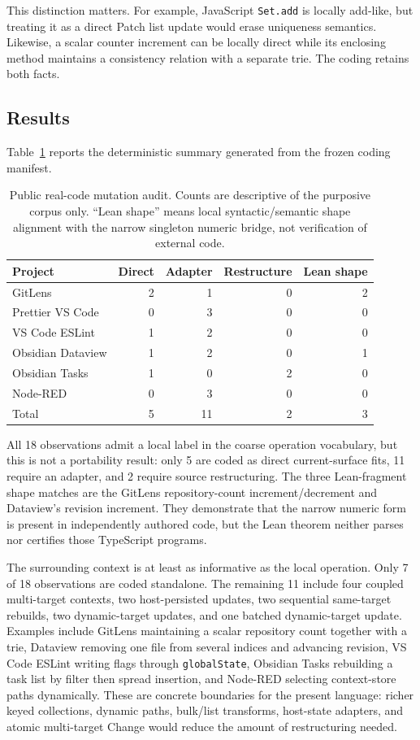 This distinction matters. For example, JavaScript \texttt{Set.add} is locally add-like, but treating it as a direct Patch list update would erase uniqueness semantics. Likewise, a scalar counter increment can be locally direct while its enclosing method maintains a consistency relation with a separate trie. The coding retains both facts.

\subsection{Results}
Table~\ref{tab:real-code-audit} reports the deterministic summary generated from the frozen coding manifest.

\begin{table}[t]
\centering
\caption{Public real-code mutation audit. Counts are descriptive of the purposive corpus only. ``Lean shape'' means local syntactic/semantic shape alignment with the narrow singleton numeric bridge, not verification of external code.}
\label{tab:real-code-audit}
\small
\begin{tabular}{lrrrr}
\toprule
Project & Direct & Adapter & Restructure & Lean shape \\
\midrule
GitLens & 2 & 1 & 0 & 2 \\
Prettier VS Code & 0 & 3 & 0 & 0 \\
VS Code ESLint & 1 & 2 & 0 & 0 \\
Obsidian Dataview & 1 & 2 & 0 & 1 \\
Obsidian Tasks & 1 & 0 & 2 & 0 \\
Node-RED & 0 & 3 & 0 & 0 \\
\midrule
Total & 5 & 11 & 2 & 3 \\
\bottomrule
\end{tabular}
\end{table}

All 18 observations admit a local label in the coarse operation vocabulary, but this is not a portability result: only 5 are coded as direct current-surface fits, 11 require an adapter, and 2 require source restructuring. The three Lean-fragment shape matches are the GitLens repository-count increment/decrement and Dataview's revision increment. They demonstrate that the narrow numeric form is present in independently authored code, but the Lean theorem neither parses nor certifies those TypeScript programs.

The surrounding context is at least as informative as the local operation. Only 7 of 18 observations are coded standalone. The remaining 11 include four coupled multi-target contexts, two host-persisted updates, two sequential same-target rebuilds, two dynamic-target updates, and one batched dynamic-target update. Examples include GitLens maintaining a scalar repository count together with a trie, Dataview removing one file from several indices and advancing revision, VS Code ESLint writing flags through \texttt{globalState}, Obsidian Tasks rebuilding a task list by filter then spread insertion, and Node-RED selecting context-store paths dynamically. These are concrete boundaries for the present language: richer keyed collections, dynamic paths, bulk/list transforms, host-state adapters, and atomic multi-target Change would reduce the amount of restructuring needed.


